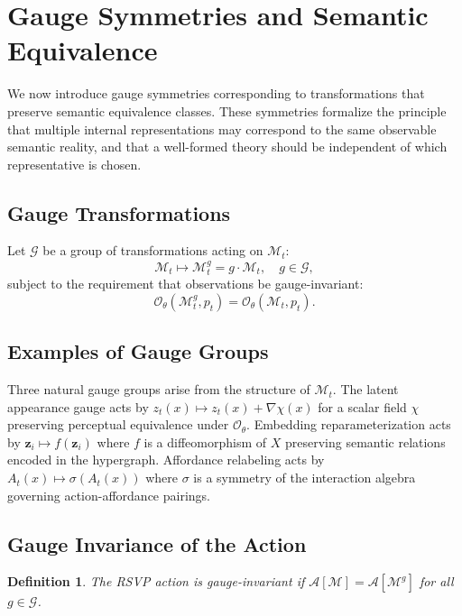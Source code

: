 \documentclass[11pt]{article}
\newtheorem{definition}[theorem]{Definition}
\begin{document}
\section{Gauge Symmetries and Semantic Equivalence}

We now introduce gauge symmetries corresponding to transformations that
preserve semantic equivalence classes.
These symmetries formalize the principle that multiple internal
representations may correspond to the same observable semantic reality,
and that a well-formed theory should be independent of which representative
is chosen.

\subsection{Gauge Transformations}

Let $\mathcal{G}$ be a group of transformations acting on $\mathcal{M}_t$:
\[
\mathcal{M}_t \mapsto \mathcal{M}_t^g
=
g \cdot \mathcal{M}_t,
\quad g \in \mathcal{G},
\]
subject to the requirement that observations be gauge-invariant:
\[
\mathcal{O}_\theta(\mathcal{M}_t^g, p_t) =
\mathcal{O}_\theta(\mathcal{M}_t, p_t).
\]

\subsection{Examples of Gauge Groups}

Three natural gauge groups arise from the structure of $\mathcal{M}_t$.
The latent appearance gauge acts by $z_t(x) \mapsto z_t(x) + \nabla \chi(x)$
for a scalar field $\chi$ preserving perceptual equivalence under
$\mathcal{O}_\theta$.
Embedding reparameterization acts by $\mathbf{z}_i \mapsto f(\mathbf{z}_i)$
where $f$ is a diffeomorphism of $X$ preserving semantic relations encoded
in the hypergraph.
Affordance relabeling acts by $A_t(x) \mapsto \sigma(A_t(x))$ where
$\sigma$ is a symmetry of the interaction algebra governing
action-affordance pairings.

\subsection{Gauge Invariance of the Action}

\begin{definition}
The RSVP action is gauge-invariant if
$\mathcal{A}[\mathcal{M}] = \mathcal{A}[\mathcal{M}^g]$
for all $g \in \mathcal{G}$.
\end{definition}
\end{document}
